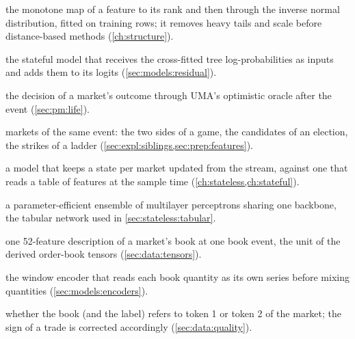 \begin{description}[nosep, font=\normalfont\itshape, leftmargin=3.2cm, style=nextline]
  \item[rank-gauss transform] the monotone map of a feature to its rank and then through the
  inverse normal distribution, fitted on training rows; it removes heavy tails and scale
  before distance-based methods (\cref{ch:structure}).
  \item[residual model] the stateful model that receives the cross-fitted tree
  log-probabilities as inputs and adds them to its logits (\cref{sec:models:residual}).
  \item[resolution] the decision of a market's outcome through UMA's optimistic oracle
  after the event (\cref{sec:pm:life}).
  \item[sibling contracts] markets of the same event: the two sides of a game, the
  candidates of an election, the strikes of a ladder (\cref{sec:expl:siblings,sec:prep:features}).
  \item[stateful / stateless model] a model that keeps a state per market updated from the
  stream, against one that reads a table of features at the sample time
  (\cref{ch:stateless,ch:stateful}).
  \item[TabM] a parameter-efficient ensemble of multilayer perceptrons sharing one
  backbone, the tabular network used in \cref{sec:stateless:tabular}.
  \item[tensor row] one 52-feature description of a market's book at one book event, the
  unit of the derived order-book tensors (\cref{sec:data:tensors}).
  \item[time-first encoder] the window encoder that reads each book quantity as its own
  series before mixing quantities (\cref{sec:models:encoders}).
  \item[token orientation] whether the book (and the label) refers to token 1 or token 2
  of the market; the sign of a trade is corrected accordingly (\cref{sec:data:quality}).
\end{description}

